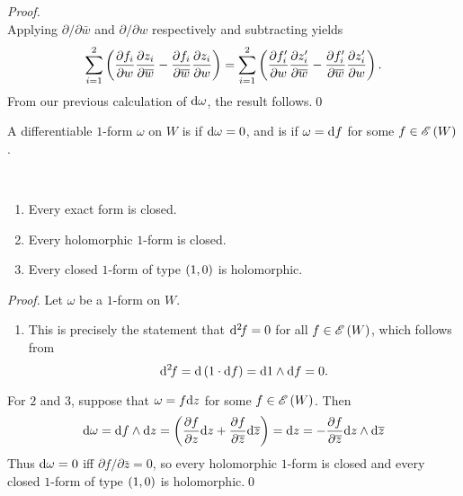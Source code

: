 \documentclass[../Moduli_Spaces_of_Riemann_Surfaces.tex]{subfiles}
\begin{document}
\begin{proof}
\begin{equation*}
        \end{equation*}
        Applying $\partial/\partial\bar{w}$ and $\partial/\partial w$ respectively and subtracting yields
        \begin{equation*}
            \sum_{i=1}^{2}\left(\frac{\partial f_i}{\partial w}\frac{\partial z_i}{\partial\overline{w}}-\frac{\partial f_i}{\partial\overline{w}}\frac{\partial z_i}{\partial w}\right)=\sum_{i=1}^{2}\left(\frac{\partial f_i'}{\partial w}\frac{\partial z_i'}{\partial\overline{w}}-\frac{\partial f_i'}{\partial\overline{w}}\frac{\partial z_i'}{\partial w}\right).
        \end{equation*}
        From our previous calculation of $\mathrm{d}\omega$, the result follows.\qed
    \end{proof}
    \begin{definition}
        A differentiable $1$-form $\omega$ on $W$ is  if $\mathrm{d}\omega=0$, and is  if $\omega=\mathrm{d} f$ for some $f\in\mathscr{E}\left(W\right)$.
    \end{definition}
    \begin{proposition}\ 
        \begin{enumerate}
            \item Every exact form is closed.
                \vspace{-0.05in}
            \item Every holomorphic $1$-form is closed.
                \vspace{-0.05in}
            \item Every closed $1$-form of type $\left(1,0\right)$ is holomorphic.
        \end{enumerate}
    \end{proposition}
    \begin{proof}
        Let $\omega$ be a $1$-form on $W$.
        \begin{enumerate}
            \item This is precisely the statement that $\mathrm{d}^2\!f=0$ for all $f\in\mathscr{E}\left(W\right)$, which follows from
                \begin{equation*}
                    \mathrm{d}^2\!f=\mathrm{d}\left(1\cdot\mathrm{d} f\right)=\mathrm{d}1\wedge\mathrm{d} f=0.
                \end{equation*}
        \end{enumerate}
        \vspace{-0.05in}
        For $2$ and $3$, suppose that $\omega=f\mathrm{d} z$ for some $f\in\mathscr{E}\left(W\right)$. Then
        \begin{equation*}
            \mathrm{d}\omega=\mathrm{d} f\wedge\mathrm{d} z=\left(\frac{\partial f}{\partial z}\mathrm{d} z+\frac{\partial f}{\partial\overline{z}}\mathrm{d}\overline{z}\right)=\mathrm{d} z=-\frac{\partial f}{\partial\overline{z}}\mathrm{d} z\wedge\mathrm{d}\overline{z}
        \end{equation*}
        Thus $\mathrm{d}\omega=0$ iff $\partial f/\partial\bar{z}=0$, so every holomorphic $1$-form is closed and every closed $1$-form of type $\left(1,0\right)$ is holomorphic.\qed
    \end{proof}
\end{document}
